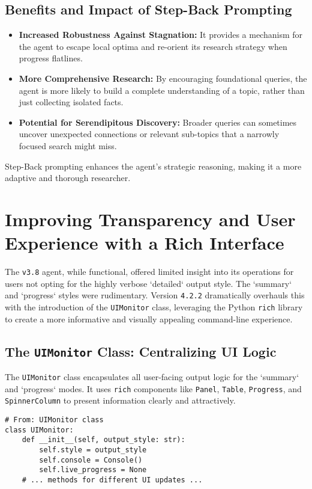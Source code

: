 \documentclass[12pt, a4paper]{article}
\begin{document}
\subsection{Benefits and Impact of Step-Back Prompting}
\begin{itemize}
    \item \textbf{Increased Robustness Against Stagnation:} It provides a mechanism for the agent to escape local optima and re-orient its research strategy when progress flatlines.
    \item \textbf{More Comprehensive Research:} By encouraging foundational queries, the agent is more likely to build a complete understanding of a topic, rather than just collecting isolated facts.
    \item \textbf{Potential for Serendipitous Discovery:} Broader queries can sometimes uncover unexpected connections or relevant sub-topics that a narrowly focused search might miss.
\end{itemize}
Step-Back prompting enhances the agent's strategic reasoning, making it a more adaptive and thorough researcher.

\section{Improving Transparency and User Experience with a Rich Interface}

The \verb|v3.8| agent, while functional, offered limited insight into its operations for users not opting for the highly verbose `detailed` output style. The `summary` and `progress` styles were rudimentary. Version \verb|4.2.2| dramatically overhauls this with the introduction of the \texttt{UIMonitor} class, leveraging the Python \texttt{rich} library to create a more informative and visually appealing command-line experience.

\subsection{The \texttt{UIMonitor} Class: Centralizing UI Logic}
The \texttt{UIMonitor} class encapsulates all user-facing output logic for the `summary` and `progress` modes. It uses \texttt{rich} components like \texttt{Panel}, \texttt{Table}, \texttt{Progress}, and \texttt{SpinnerColumn} to present information clearly and attractively.


\begin{lstlisting}[style=myPython]
# From: UIMonitor class
class UIMonitor:
    def __init__(self, output_style: str):
        self.style = output_style
        self.console = Console()
        self.live_progress = None
    # ... methods for different UI updates ...
\end{lstlisting}
\end{document}
